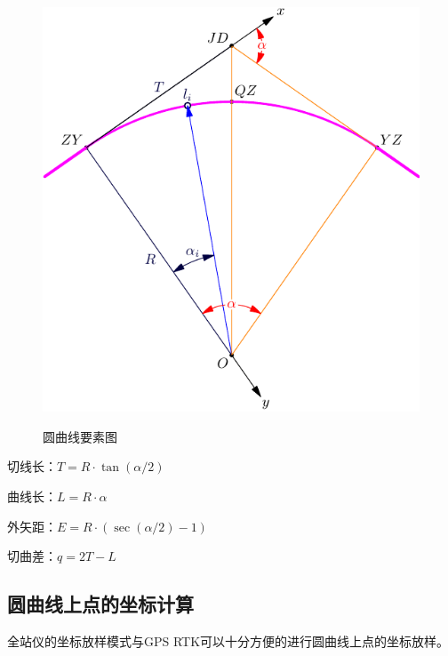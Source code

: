\begin{figure}[htbp]
{        \includegraphics[scale=0.7]{route/RightCircleRoute.pdf}
    }
    \caption{圆曲线要素图}
    \label{fig:CircleRoute}
\end{figure}




 
 切线长：$T = R \cdot \tan (\alpha / 2)$

 曲线长：$L = R \cdot \alpha$

 外矢距：$E=R \cdot (\sec (\alpha /2) - 1)$

 切曲差：$q = 2T - L$

 \subsection{圆曲线上点的坐标计算}
 全站仪的坐标放样模式与GPS RTK可以十分方便的进行圆曲线上点的坐标放样。

